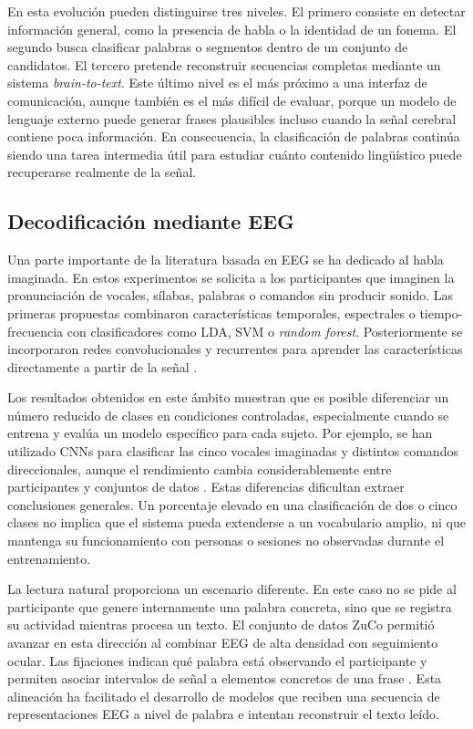 En esta evolución pueden distinguirse tres niveles. El primero consiste en detectar información general, como la presencia de habla o la identidad de un fonema. El segundo busca clasificar palabras o segmentos dentro de un conjunto de candidatos. El tercero pretende reconstruir secuencias completas mediante un sistema \textit{brain-to-text}. Este último nivel es el más próximo a una interfaz de comunicación, aunque también es el más difícil de evaluar, porque un modelo de lenguaje externo puede generar frases plausibles incluso cuando la señal cerebral contiene poca información. En consecuencia, la clasificación de palabras continúa siendo una tarea intermedia útil para estudiar cuánto contenido lingüístico puede recuperarse realmente de la señal.

\subsection{Decodificación mediante EEG}

Una parte importante de la literatura basada en EEG se ha dedicado al habla imaginada. En estos experimentos se solicita a los participantes que imaginen la pronunciación de vocales, sílabas, palabras o comandos sin producir sonido. Las primeras propuestas combinaron características temporales, espectrales o tiempo-frecuencia con clasificadores como LDA, SVM o \textit{random forest}. Posteriormente se incorporaron redes convolucionales y recurrentes para aprender las características directamente a partir de la señal \cite{panachakel2021covert,alzahrani2024systematic}.

Los resultados obtenidos en este ámbito muestran que es posible diferenciar un número reducido de clases en condiciones controladas, especialmente cuando se entrena y evalúa un modelo específico para cada sujeto. Por ejemplo, se han utilizado CNNs para clasificar las cinco vocales imaginadas y distintos comandos direccionales, aunque el rendimiento cambia considerablemente entre participantes y conjuntos de datos \cite{tamm2020vowels,sarmiento2021vowels}. Estas diferencias dificultan extraer conclusiones generales. Un porcentaje elevado en una clasificación de dos o cinco clases no implica que el sistema pueda extenderse a un vocabulario amplio, ni que mantenga su funcionamiento con personas o sesiones no observadas durante el entrenamiento.

La lectura natural proporciona un escenario diferente. En este caso no se pide al participante que genere internamente una palabra concreta, sino que se registra su actividad mientras procesa un texto. El conjunto de datos ZuCo permitió avanzar en esta dirección al combinar EEG de alta densidad con seguimiento ocular. Las fijaciones indican qué palabra está observando el participante y permiten asociar intervalos de señal a elementos concretos de una frase \cite{hollenstein2020zuco2}. Esta alineación ha facilitado el desarrollo de modelos que reciben una secuencia de representaciones EEG a nivel de palabra e intentan reconstruir el texto leído.

